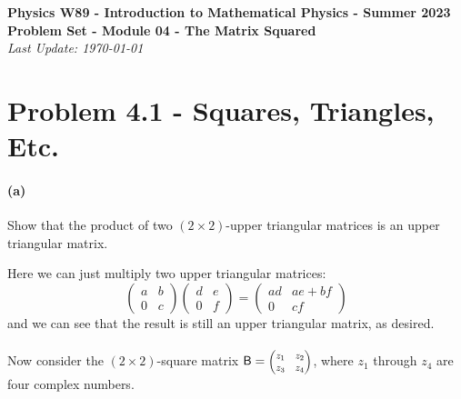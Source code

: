 \documentclass{article}
\begin{document}
\addcopyright
\begin{center}
{\bf \large Physics W89 - Introduction to Mathematical Physics - Summer 2023}\\\medskip
{\bf \large Problem Set - Module 04 - The Matrix Squared} \\\medskip
{\emph{Last Update: \today}}
\end{center}


\dphline
\bigskip
\section*{Problem 4.1 - Squares, Triangles, Etc.}


\paragraph{(a)}
Show that the product of two $(2\times 2)$-upper triangular matrices is an upper triangular matrix.  

\begin{solution}
	Here we can just multiply two upper triangular matrices:
	\[
		\begin{pmatrix} a & b \\ 0 & c \end{pmatrix} \begin{pmatrix} d & e\\0 & f \end{pmatrix} = 
		\begin{pmatrix} ad & ae + bf \\ 0 & cf \end{pmatrix} 
	\] 
	and we can see that the result is still an upper triangular matrix, as desired. 
\end{solution}



\phline
\paragraph{}
Now consider the $(2\times2)$-square matrix $\mathsf{B} = \smmatrix{0.8}{z_{1} & z_{2} \\ z_{3} & z_{4}}$, where $z_{1}$ through $z_{4}$ are four complex numbers.
\end{document}
